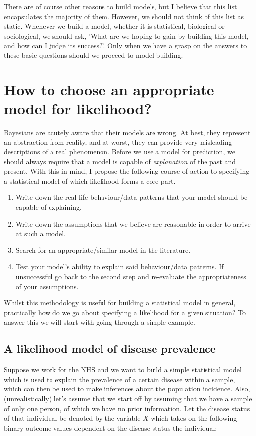 \documentclass[11pt,fullpage]{book}
\begin{document}
There are of course other reasons to build models, but I believe that this list encapsulates the majority of them. However, we should not think of this list as static. Whenever we build a model, whether it is statistical, biological or sociological, we should ask, 'What are we hoping to gain by building this model, and how can I judge its success?'. Only when we have a grasp on the answers to these basic questions should we proceed to model building.

\section{How to choose an appropriate model for likelihood?}
Bayesians are acutely aware that their models are wrong. At best, they represent an abstraction from reality, and at worst, they can provide very misleading descriptions of a real phenomenon. Before we use a model for prediction, we should always require that a model is capable of \textit{explanation} of the past and present. With this in mind, I propose the following course of action to specifying a statistical model of which likelihood forms a core part.

\begin{enumerate}
\item Write down the real life behaviour/data patterns that your model should be capable of explaining.
\item Write down the assumptions that we believe are reasonable in order to arrive at such a model.
\item Search for an appropriate/similar model in the literature.
\item Test your model's ability to explain said behaviour/data patterns. If unsuccessful go back to the second step and re-evaluate the appropriateness of your assumptions.
\end{enumerate}

Whilst this methodology is useful for building a statistical model in general, practically how do we go about specifying a likelihood for a given situation? To answer this we will start with going through a simple example.

\subsection{A likelihood model of disease prevalence}
Suppose we work for the NHS and we want to build a simple statistical model which is used to explain the prevalence of a certain disease within a sample, which can then be used to make inferences about the population incidence. Also, (unrealistically) let's assume that we start off by assuming that we have a sample of only one person, of which we have no prior information. Let the disease status of that individual be denoted by the variable $X$ which takes on the following binary outcome values dependent on the disease status the individual:
\end{document}
